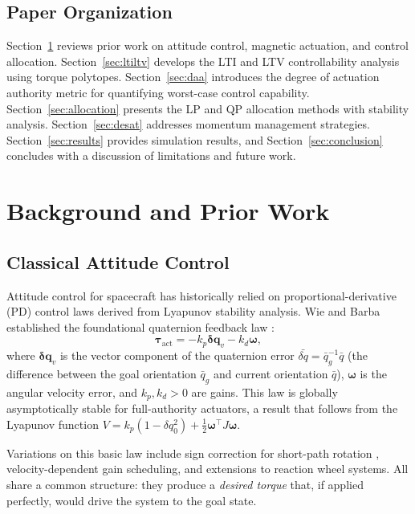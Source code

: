 \documentclass[conference]{IEEEtran}
\begin{document}
\subsection{Paper Organization}
Section~\ref{sec:background} reviews prior work on attitude control, magnetic actuation, and control allocation. Section~\ref{sec:ltiltv} develops the LTI and LTV controllability analysis using torque polytopes. Section~\ref{sec:daa} introduces the degree of actuation authority metric for quantifying worst-case control capability. Section~\ref{sec:allocation} presents the LP and QP allocation methods with stability analysis. Section~\ref{sec:desat} addresses momentum management strategies. Section~\ref{sec:results} provides simulation results, and Section~\ref{sec:conclusion} concludes with a discussion of limitations and future work.

\section{Background and Prior Work}\label{sec:background}

\subsection{Classical Attitude Control}
Attitude control for spacecraft has historically relied on proportional-derivative (PD) control laws derived from Lyapunov stability analysis. Wie and Barba established the foundational quaternion feedback law \cite{wie_quaternion_1985}:
\begin{equation}
 \boldsymbol{\tau}_\text{act} = -k_p \mathbf{\delta q}_v - k_d\boldsymbol{\omega},
 \label{eq:pd_control}
\end{equation}
where $\mathbf{\delta q}_v$ is the vector component of the quaternion error $\bar{\delta q} = \bar{q}_g^{-1} \bar{q}$ (the difference between the goal orientation $\bar{q}_g$ and current orientation $\bar{q}$), $\boldsymbol{\omega}$ is the angular velocity error, and $k_p, k_d > 0$ are gains. This law is globally asymptotically stable for full-authority actuators, a result that follows from the Lyapunov function $V = k_p(1 - \delta q_0^2) + \frac{1}{2}\boldsymbol{\omega}^\top J \boldsymbol{\omega}$.

Variations on this basic law include sign correction for short-path rotation \cite{markley_fundamentals_2014}, velocity-dependent gain scheduling, and extensions to reaction wheel systems. All share a common structure: they produce a \emph{desired torque} that, if applied perfectly, would drive the system to the goal state.
\end{document}

